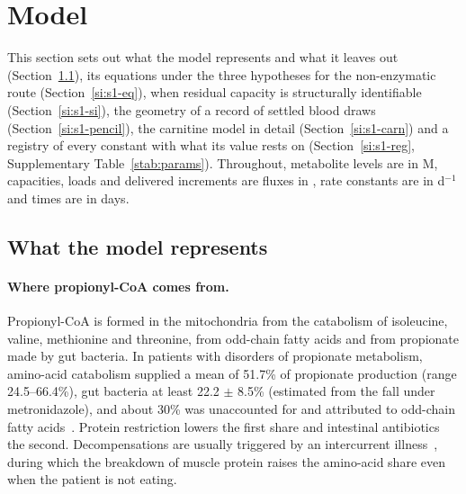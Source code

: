 \section{Model}
\label{si:s1}

This section sets out what the model represents and what it leaves out
(Section~\ref{si:s1-bio}), its equations under the three hypotheses for the non-enzymatic
route (Section~\ref{si:s1-eq}), when residual capacity is structurally identifiable
(Section~\ref{si:s1-si}), the geometry of a record of settled blood draws
(Section~\ref{si:s1-pencil}), the carnitine model in detail (Section~\ref{si:s1-carn}) and
a registry of every constant with what its value rests on
(Section~\ref{si:s1-reg}, Supplementary Table~\ref{stab:params}). Throughout, metabolite
levels are in \textmu M, capacities, loads and delivered increments are fluxes in \um, rate
constants are in d$^{-1}$ and times are in days.

\subsection{What the model represents}
\label{si:s1-bio}

\paragraph{Where propionyl-CoA comes from.} Propionyl-CoA is formed in the mitochondria from
the catabolism of isoleucine, valine, methionine and threonine, from odd-chain fatty acids
and from propionate made by gut bacteria. In patients with disorders of propionate metabolism, amino-acid catabolism supplied a mean of 51.7\% of propionate
production (range 24.5--66.4\%), gut bacteria at least 22.2 $\pm$ 8.5\% (estimated from
the fall under metronidazole), and about 30\% was unaccounted for and attributed to
odd-chain fatty acids~\cite{propionate_sources}. Protein restriction lowers the first
share and intestinal antibiotics the second. Decompensations are usually triggered by an
intercurrent illness~\cite{pa_guidelines}, during which the breakdown of muscle protein
raises the amino-acid share even when the patient is not eating.

